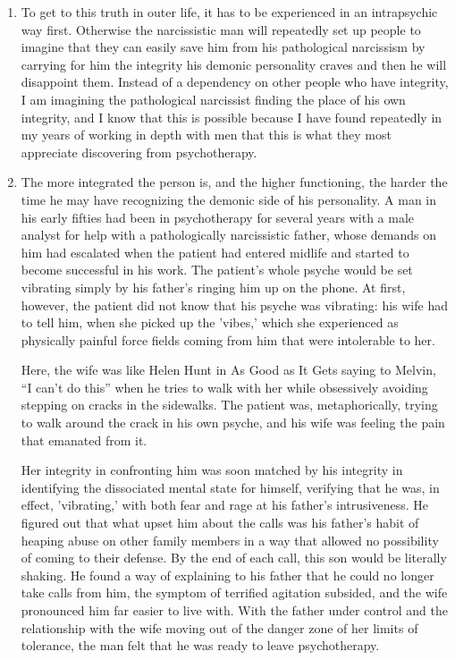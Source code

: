 \begin{enumerate}
\item {} To get to this truth
in outer life, it has to be experienced in an intrapsychic way first. Otherwise
the narcissistic man will repeatedly set up people to imagine that they can
easily save him from his pathological narcissism by carrying for him the
integrity his demonic personality craves and then he will disappoint them.
Instead of a dependency on other people who have integrity, I am imagining the
pathological narcissist finding the place of his own integrity, and I know that
this is possible because I have found repeatedly in my years of working in
depth with men that this is what they most appreciate discovering from
psychotherapy.

\item {}
The more integrated the person is, and the higher functioning, the harder the
time he may have recognizing the demonic side of his personality. A man in his
early fifties had been in psychotherapy for several years with a male analyst
for help with a pathologically narcissistic father, whose demands on him had
escalated when the patient had entered midlife and started to become successful
in his work. The patient's whole psyche would be set vibrating simply by his
father's ringing him up on the phone. At first, however, the patient did not
know that his psyche was vibrating: his wife had to tell him, when she picked
up the 'vibes,' which she experienced as physically painful force fields coming
from him that were intolerable to her.

Here, the wife was like Helen Hunt in As Good as It Gets saying to Melvin, ``I
can't do this'' when he tries to walk with her while obsessively avoiding
stepping on cracks in the sidewalks. The patient was, metaphorically, trying to
walk around the crack in his own psyche, and his wife was feeling the pain that
emanated from it.

Her integrity in confronting him was soon matched by his integrity in
identifying the dissociated mental state for himself, verifying that he was, in
effect, 'vibrating,' with both fear and rage at his father's intrusiveness. He
figured out that what upset him about the calls was his father's habit of
heaping abuse on other family members in a way that allowed no possibility of
coming to their defense. By the end of each call, this son would be literally
shaking. He found a way of explaining to his father that he could no longer
take calls from him, the symptom of terrified agitation subsided, and the wife
pronounced him far easier to live with. With the father under control and the
relationship with the wife moving out of the danger zone of her limits of
tolerance, the man felt that he was ready to leave psychotherapy.


\end{enumerate}
